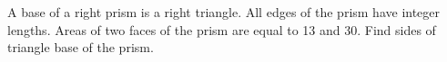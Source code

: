 \problem
A base of a right prism is a right triangle.
All edges of the prism have integer lengths.
Areas of two faces of the prism are equal to 13 and 30.
Find sides of triangle base of the prism.

\solution

\endproblem
